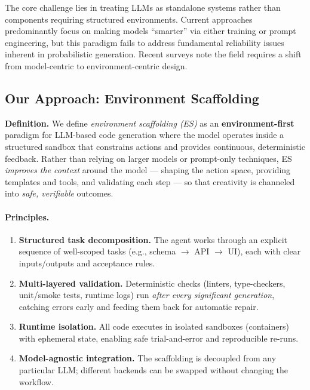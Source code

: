\documentclass[11pt]{article}
\begin{document}
The core challenge lies in treating LLMs as standalone systems rather than components requiring structured environments. Current approaches predominantly focus on making models ``smarter'' via either training or prompt engineering, but this paradigm fails to address fundamental reliability issues inherent in probabilistic generation. Recent surveys \citep{jiang2024survey,paul2024benchmarks} note the field requires a shift from model-centric to environment-centric design.

\subsection{Our Approach: Environment Scaffolding}

\textbf{Definition.} We define \emph{environment scaffolding (ES)} as an \textbf{environment-first} paradigm for LLM-based code generation where the model operates inside a structured sandbox that constrains actions and provides continuous, deterministic feedback. Rather than relying on larger models or prompt-only techniques, ES \emph{improves the context} around the model --- shaping the action space, providing templates and tools, and validating each step --- so that creativity is channeled into \emph{safe, verifiable} outcomes.

\paragraph{Principles.}
\begin{enumerate}
  \item \textbf{Structured task decomposition.} The agent works through an explicit sequence of well-scoped tasks (e.g., schema $\rightarrow$ API $\rightarrow$ UI), each with clear inputs/outputs and acceptance rules.
  \item \textbf{Multi-layered validation.} Deterministic checks (linters, type-checkers, unit/smoke tests, runtime logs) run \emph{after every significant generation}, catching errors early and feeding them back for automatic repair.
  \item \textbf{Runtime isolation.} All code executes in isolated sandboxes (containers) with ephemeral state, enabling safe trial-and-error and reproducible re-runs.
  \item \textbf{Model-agnostic integration.} The scaffolding is decoupled from any particular LLM; different backends can be swapped without changing the workflow.
\end{enumerate}
\end{document}
